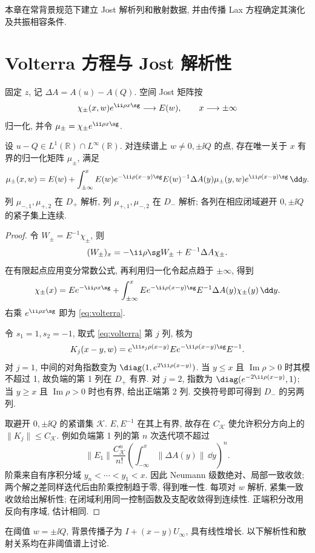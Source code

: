 本章在常背景规范下建立 Jost 解析列和散射数据, 并由传播 Lax 方程确定其演化及共振相容条件.

\section{Volterra 方程与 Jost 解析性}
固定 $z$, 记 $\Delta A=A(u)-A(Q)$. 空间 Jost 矩阵按
\[
\chi_\pm(x,w)e^{\ii\rho x\sg}\longrightarrow E(w),
\qquad x\longrightarrow\pm\infty
\]
归一化, 并令 $\mu_\pm=\chi_\pm e^{\ii\rho x\sg}$.

\begin{theorem}\label{thm:jost}
设 $u-Q\in L^1(\mathbb R)\cap L^\infty(\mathbb R)$. 对连续谱上 $w\ne0,\pm\ii Q$ 的点, 存在唯一关于 $x$ 有界的归一化矩阵 $\mu_\pm$, 满足
\begin{equation}\label{eq:volterra}
\mu_\pm(x,w)=E(w)+\int_{\pm\infty}^{x}
E(w)e^{-\ii\rho(x-y)\sg}E(w)^{-1}
\Delta A(y)\mu_\pm(y,w)e^{\ii\rho(x-y)\sg}\,\dd y.
\end{equation}
列 $\mu_{-,1},\mu_{+,2}$ 在 $D_+$ 解析, 列 $\mu_{+,1},\mu_{-,2}$ 在 $D_-$ 解析; 各列在相应闭域避开 $0,\pm\ii Q$ 的紧子集上连续.
\end{theorem}
\begin{proof}
令 $W_\pm=E^{-1}\chi_\pm$, 则
\[
(W_\pm)_x=-\ii\rho\sg W_\pm+E^{-1}\Delta A\chi_\pm.
\]
在有限起点应用变分常数公式, 再利用归一化令起点趋于 $\pm\infty$, 得到
\[
\chi_\pm(x)=E e^{-\ii\rho x\sg}
+\int_{\pm\infty}^{x}E e^{-\ii\rho(x-y)\sg}E^{-1}\Delta A(y)\chi_\pm(y)\,\dd y.
\]
右乘 $e^{\ii\rho x\sg}$ 即为 \eqref{eq:volterra}.

令 $s_1=1,s_2=-1$, 取式 \eqref{eq:volterra} 第 $j$ 列, 核为
\begin{equation}\label{eq:columnkernel}
K_j(x-y,w)=
e^{\ii s_j\rho(x-y)}
E e^{-\ii\rho(x-y)\sg}E^{-1}.
\end{equation}
对 $j=1$, 中间的对角指数变为
$\diag(1,e^{2\ii\rho(x-y)})$. 当 $y\le x$ 且 $\operatorname{Im}\rho>0$ 时其模不超过 1, 故负端的第 1 列在 $D_+$ 有界. 对 $j=2$, 指数为
$\diag(e^{-2\ii\rho(x-y)},1)$; 当 $y\ge x$ 且 $\operatorname{Im}\rho>0$ 时也有界, 给出正端第 2 列. 交换符号即可得到 $D_-$ 的另两列.

取避开 $0,\pm\ii Q$ 的紧谱集 $\mathcal K$. $E,E^{-1}$ 在其上有界, 故存在 $C_{\mathcal K}$ 使允许积分方向上的 $\|K_j\|\le C_{\mathcal K}$. 例如负端第 1 列的第 $n$ 次迭代项不超过
\[
\|E_1\|\dfrac{C_{\mathcal K}^n}{n!}
\left(\int_{-\infty}^{x}\|\Delta A(y)\|\,\dd y\right)^n.
\]
阶乘来自有序积分域 $y_n<\cdots<y_1<x$. 因此 Neumann 级数绝对、局部一致收敛; 两个解之差同样迭代后由阶乘控制趋于零, 得到唯一性. 每项对 $w$ 解析, 紧集一致收敛给出解析性; 在闭域利用同一控制函数及支配收敛得到连续性. 正端积分改用反向有序域, 估计相同.
\end{proof}
在阈值 $w=\pm\ii Q$, 背景传播子为 $I+(x-y)U_\infty$, 具有线性增长. 以下解析性和散射关系均在非阈值谱上讨论.

